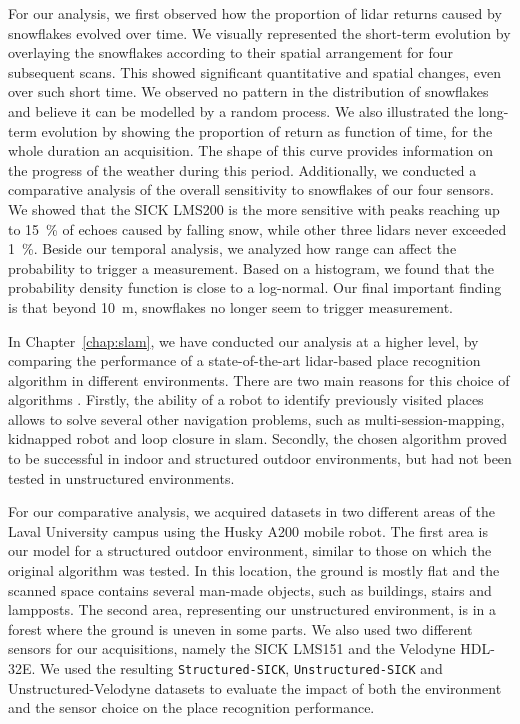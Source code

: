 For our analysis, we first observed how the proportion of \gls*{lidar} returns caused by snowflakes evolved over time. We visually represented the short-term evolution by overlaying the snowflakes according to their spatial arrangement for four subsequent scans. This showed significant quantitative and spatial changes, even over such short time. We observed no pattern in the distribution of snowflakes and believe it can be modelled by a random process. We also illustrated the long-term evolution by showing the proportion of return as function of time, for the whole duration an acquisition. The shape of this curve provides information on the progress of the weather during this period. Additionally, we conducted a comparative analysis of the overall sensitivity to snowflakes of our four sensors. We showed that the SICK LMS200 is the more sensitive with peaks reaching up to \SI{15}{\percent} of echoes caused by falling snow, while other three \gls*{lidar}s never exceeded \SI{1}{\percent}. Beside our temporal analysis, we analyzed how range can affect the probability to trigger a measurement. Based on a histogram, we found that the probability density function is close to a log-normal. Our final important finding is that beyond \SI{10}{\meter}, snowflakes no longer seem to trigger measurement.

In Chapter~\ref{chap:slam}, we have conducted our analysis at a higher level, by comparing the performance of a state-of-the-art \gls*{lidar}-based place recognition algorithm in different environments. There are two main reasons for this choice of algorithms . Firstly, the ability of a robot to identify previously visited places allows to solve several other navigation problems, such as multi-session-mapping, kidnapped robot and loop closure in \gls*{slam}. Secondly, the chosen algorithm proved to be successful in indoor and structured outdoor environments, but had not been tested in unstructured environments.

For our comparative analysis, we acquired datasets in two different areas of the Laval University campus using the Husky A200 mobile robot. The first area is our model for a structured outdoor environment, similar to those on which the original algorithm was tested. In this location, the ground is mostly flat and the scanned space contains several man-made objects, such as buildings, stairs and lampposts. The second area, representing our unstructured environment, is in a forest where the ground is uneven in some parts. We also used two different sensors for our acquisitions, namely the SICK LMS151 and the Velodyne HDL-32E. We used the resulting \texttt{Structured-SICK}, \texttt{Unstructured-SICK} and Unstructured-Velodyne datasets to evaluate the impact of both the environment and the sensor choice on the place recognition performance.

